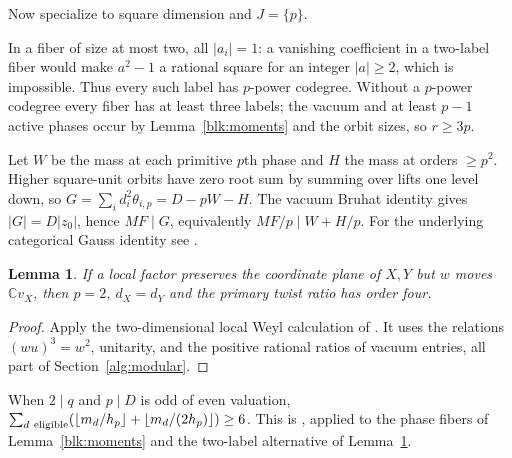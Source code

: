 \documentclass[11pt]{amsart}
\numberwithin{equation}{section}
\newtheorem{lemma}[theorem]{Lemma}
\theoremstyle{definition}
\theoremstyle{plain}
\begin{document}
Now specialize to square dimension and $J=\{p\}$.

In a fiber of size at most two, all $|a_i|=1$: a vanishing coefficient
in a two-label fiber would make $a^2-1$ a rational square for an
integer $|a|\ge2$, which is impossible. Thus every such label has
$p$-power codegree. Without a $p$-power codegree every fiber has at
least three labels; the vacuum and at least $p-1$ active phases
occur by Lemma~\ref{blk:moments} and the orbit sizes, so $r\ge3p$.

Let $W$ be the mass at each primitive $p$th phase and $H$ the mass
at orders $\ge p^2$. Higher square-unit orbits have zero root sum
by summing over lifts one level down, so $G=\sum_i d_i^2\theta_{i,p}
=D-pW-H$. The vacuum Bruhat identity gives $|G|=D|z_0|$, hence
$MF\mid G$, equivalently $MF/p\mid W+H/p$. For the underlying
categorical Gauss identity see \cite[Proposition~3.3]{NSWGauss}.

\begin{lemma}\label{blk:two}
If a local factor preserves the coordinate plane of $X,Y$ but $w$
moves $\mathbb C v_X$, then $p=2$, $d_X=d_Y$ and the primary twist
ratio has order four.
\end{lemma}
\begin{proof}
Apply the two-dimensional local Weyl calculation of
\cite[Lemma~19.5]{BDPcore}. It uses the relations $(wu)^3=w^2$,
unitarity, and the positive rational ratios of vacuum entries,
all part of Section~\ref{alg:modular}.
\end{proof}

When $2\mid q$ and $p\mid D$ is odd of even valuation,
$\sum_{d\ {\rm eligible}}(\lfloor m_d/h_p\rfloor+
\lfloor m_d/(2h_p)\rfloor)\ge6$. This is \cite[Lemma~19.6]{BDPcore}, applied to the phase fibers
of Lemma~\ref{blk:moments} and the two-label alternative of
Lemma~\ref{blk:two}.
\end{document}
